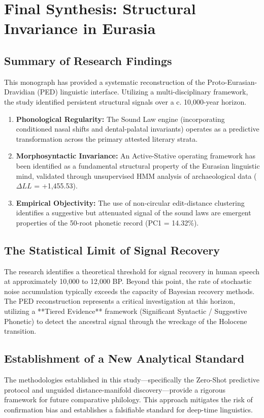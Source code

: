 \documentclass[11pt,oneside,openany]{book}
\begin{document}
\chapter{Final Synthesis: Structural Invariance in Eurasia}

\section{Summary of Research Findings}
This monograph has provided a systematic reconstruction of the Proto-Eurasian-Dravidian (PED) linguistic interface. Utilizing a multi-disciplinary framework, the study identified persistent structural signals over a c. 10,000-year horizon.
\begin{enumerate}
    \item \textbf{Phonological Regularity:} The Sound Law engine (incorporating conditioned nasal shifts and dental-palatal invariants) operates as a predictive transformation across the primary attested literary strata.
    \item \textbf{Morphosyntactic Invariance:} An Active-Stative operating framework has been identified as a fundamental structural property of the Eurasian linguistic mind, validated through unsupervised HMM analysis of archaeological data ($\Delta LL$ = +1,455.53).
    \item \textbf{Empirical Objectivity:} The use of non-circular edit-distance clustering identifies a suggestive but attenuated signal of the sound laws are emergent properties of the 50-root phonetic record (PC1 = 14.32\%).
\end{enumerate}

\section{The Statistical Limit of Signal Recovery}
The research identifies a theoretical threshold for signal recovery in human speech at approximately 10,000 to 12,000 BP. Beyond this point, the rate of stochastic noise accumulation typically exceeds the capacity of Bayesian recovery methods. The PED reconstruction represents a critical investigation at this horizon, utilizing a **Tiered Evidence** framework (Significant Syntactic / Suggestive Phonetic) to detect the ancestral signal through the wreckage of the Holocene transition.

\section{Establishment of a New Analytical Standard}
The methodologies established in this study---specifically the Zero-Shot predictive protocol and unguided distance-manifold discovery---provide a rigorous framework for future comparative philology. This approach mitigates the risk of confirmation bias and establishes a falsifiable standard for deep-time linguistics.
\end{document}
